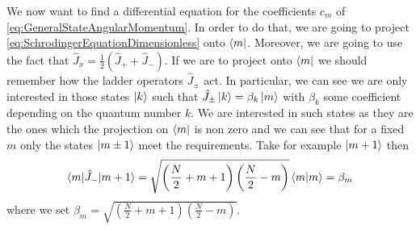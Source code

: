 We now want to find a differential equation for the coefficients $ c_{m} $ of \cref{eq:GeneralStateAngularMomentum}.
In order to do that, we are going to project \cref{eq:SchrodingerEquationDimensionless} onto $ \bra{m} $.
Moreover, we are going to use the fact that $ \hat{J}_x = \frac{1}{2}\left(\hat{J}_{+} + \hat{J}_{-}\right) $.
If we are to project onto $ \bra{m} $ we should remember how the ladder operators $ \hat{J}_{\pm} $ act.
In particular, we can see we are only interested in those states $ \ket{k} $ such that $ \hat{J}_{\pm}\ket{k} = \beta_{k} \ket{m} $ with $ \beta_{k} $ some coefficient depending on the quantum number $ k $.
We are interested in such states as they are the ones which the projection on $ \bra{m} $ is non zero and we can see that for a fixed $ m $   only the states $ \ket{m \pm 1} $ meet the requirements.
Take for example $ \ket{m +1} $ then
\begin{equation}
	\label{eq:LadderOperatorsProjected}
	\braket{m|\hat{J}_{-} |m + 1 } = \sqrt{
		\left(\frac{N}{2} + m +1\right)
		\left(\frac{N}{2} -m\right)
	}
	\braket{m|m}
	=
	\beta_{m}
\end{equation}
where we set $ \beta_{m} =\sqrt {    \left(\frac{N}{2} + m +1\right)  \left(\frac{N}{2} -m\right) }$.\\

